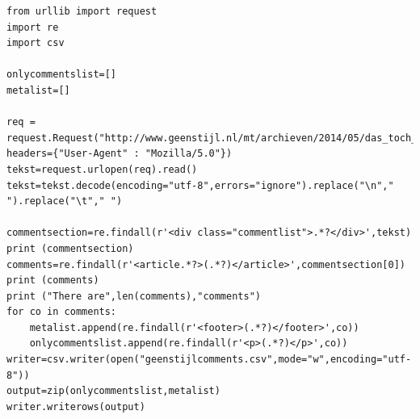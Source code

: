 \documentclass{beamer}
\begin{document}
\begin{frame}
\begin{lstlisting}
from urllib import request
import re
import csv

onlycommentslist=[]
metalist=[]

req = request.Request("http://www.geenstijl.nl/mt/archieven/2014/05/das_toch_niet_normaal.html", headers={"User-Agent" : "Mozilla/5.0"})
tekst=request.urlopen(req).read()
tekst=tekst.decode(encoding="utf-8",errors="ignore").replace("\n"," ").replace("\t"," ")

commentsection=re.findall(r'<div class="commentlist">.*?</div>',tekst)
print (commentsection)
comments=re.findall(r'<article.*?>(.*?)</article>',commentsection[0])
print (comments)
print ("There are",len(comments),"comments")
for co in comments:
    metalist.append(re.findall(r'<footer>(.*?)</footer>',co))
    onlycommentslist.append(re.findall(r'<p>(.*?)</p>',co))
writer=csv.writer(open("geenstijlcomments.csv",mode="w",encoding="utf-8"))
output=zip(onlycommentslist,metalist)
writer.writerows(output)
\end{lstlisting}
\end{frame}

{
\begin{frame}[plain]
\end{frame}
}
\end{document}
